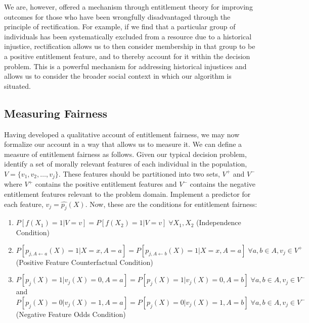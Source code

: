 We are, however, offered a mechanism through entitlement theory for improving
outcomes for those who have been wrongfully disadvantaged through the principle
of rectification. For example, if we find that a particular group of individuals
has been systematically excluded from a resource due to a historical injustice,
rectification allows us to then consider membership in that group to be a
positive entitlement feature, and to thereby account for it within the decision
problem. This is a powerful mechanism for addressing historical injustices
and allows us to consider the broader social context in which our algorithm is
situated. 

\subsection{Measuring Fairness}

Having developed a qualitative account of entitlement fairness, we may now
formalize our account in a way that allows us to measure it. We can
define a measure of entitlement fairness as follows. Given our typical decision
problem, identify a set of morally relevant features of each individual in the
population, $V = \{v_1, v_2, \ldots, v_j\}$. These features should be
partitioned into two sets, $V^+$ and $V^-$ where $V^+$ contains the positive
entitlement features and $V^-$ contains the negative entitlement features 
relevant to the problem domain. Implement a predictor for each feature,
$v_j = \hat{p_j}(X)$. Now, these are the conditions for entitlement fairness:
\begin{enumerate}
    \item $P[f(X_1) = 1 | V = v] = P[f(X_2) = 1 | V = v]\;\forall X_1, X_2$ (Independence Condition)
    \item $P[p_{j, A\leftarrow a}(X) = 1 | X=x, A=a] = P[p_{j, A\leftarrow b}(X) = 1 | X=x, A=a]\;\forall a, b \in A, v_j \in V^+$ (Positive Feature Counterfactual Condition)
    \item $P[p_j(X) = 1 | v_j(X) = 0, A = a] = P[p_j(X) = 1 | v_j(X) = 0, A = b]\;\forall a, b \in A, v_j \in V^-$ and 
    $P[p_j(X) = 0 | v_j(X) = 1, A = a] = P[p_j(X) = 0 | v_j(X) = 1, A = b]\;\forall a, b \in A, v_j \in V^-$ (Negative Feature Odds Condition)
\end{enumerate}

